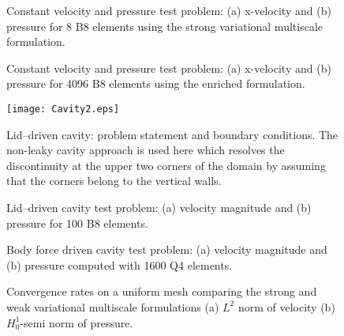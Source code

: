 \documentclass[11pt]{amsart}
\begin{document}
\begin{figure}[htb!]
	\centering
{}
	\caption{Constant velocity and pressure test problem: (a) x-velocity and (b) pressure for 8 B8 elements using the strong variational multiscale formulation.}
	\label{fig:StabilizedCoarse2}
\end{figure}
\begin{figure}[htb!]
	\centering
{}
	\caption{Constant velocity and pressure test problem: (a) x-velocity and (b) pressure for 4096 B8 elements using the enriched formulation.}
	\label{fig:ConstantFlowRefined}
\end{figure}
\begin{figure}[htb!]
	\centering
  \texttt{[image: Cavity2.eps]}
	\caption{Lid--driven cavity: problem statement and boundary conditions.  The non-leaky cavity approach is used here which resolves the discontinuity at the upper two corners of the domain by assuming that the corners belong to the vertical walls.}
	\label{fig:Cavity}
\end{figure}
\begin{figure}[htb!]
	\begin{center}
  \end{center}
	\caption{Lid--driven cavity test problem: (a) velocity magnitude and (b) pressure for 100 B8 elements.}
	\label{fig:CavityVelPress}
\end{figure}
\begin{figure}[htb!]
	\begin{center}
  \end{center}
	\caption{Body force driven cavity test problem: (a) velocity magnitude and (b) pressure computed with 1600 Q4 elements.}
	\label{fig:BodyForce}
\end{figure}
\begin{figure}[htb!]
	\centering
	\caption{Convergence rates on a uniform mesh comparing the strong and weak variational multiscale formulations (a) $L^2$ norm of velocity (b) $H^1_0$-semi norm of pressure.}
	\label{fig:Convergence}
\end{figure} 
\end{document}
